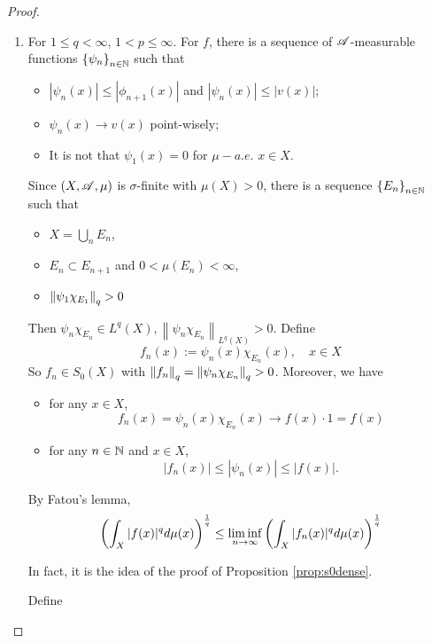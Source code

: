 \begin{proof}
\begin{enumerate}[label=(\roman*)]
		\item For $1 \leq q < \infty$, $1 < p \leq \infty$. For $f$, there is a sequence of $\mathscr{A}$-measurable functions $\left\{\psi_n\right\}_{n \in \mathbb{N}}$ such that
		\begin{itemize}
			\item $\left|\psi_n(x)\right| \leq\left|\phi_{n+1}(x)\right|$ and $\left|\psi_n(x)\right| \leq|v(x)|$;
			\item $\psi_n(x) \rightarrow v(x)$ point-wisely;
			\item It is not that $\psi_1(x) = 0$ for $\mu-a.e.$ $x \in X$.
		\end{itemize}
		Since $(X,\mathscr{A},\mu)$ is $\sigma$-finite with $\mu(X) > 0$, there is a sequence $\left\{E_n\right\}_{n \in \mathbb{N}}$ such that
		\begin{itemize}
			\item $X = \bigcup_n E_n$,
			\item $E_n \subset E_{n+1}$ and $0 < \mu(E_n) < \infty$,
			\item $\left\lVert\psi_1\chi_{E_1}\right\lVert_q > 0$
		\end{itemize}
		Then $\psi_n \chi_{E_n} \in L^q(X),\left\|\psi_n \chi_{E_n}\right\|_{L^q(X)}>0$. Define
		\begin{equation*}
			f_n(x):=\psi_n(x) \chi_{E_n}(x),\quad x\in X
		\end{equation*}
		So $f_n \in S_0(X)$ with $\left\lVert f_n\right\lVert_q = \left\lVert\psi_n\chi_{E_n}\right\lVert_q > 0$. Moreover, we have
		\begin{itemize}
			\item for any $x \in X$,
			\begin{equation*}
				f_n(x)=\psi_n(x) \chi_{E_n}(x) \longrightarrow f(x) \cdot 1=f(x)
			\end{equation*}
			\item for any $n \in \mathbb{N}$ and $x \in X$,
			\begin{equation*}
				\left|f_n(x)\right| \leq\left|\psi_n(x)\right| \leq|f(x)| .
			\end{equation*}
		\end{itemize}
		By Fatou's lemma,
		\begin{equation*}
			\left(\int_X|f(x)|^q d \mu(x)\right)^{\frac{1}{q}} \leq \liminf_{n \rightarrow \infty} \left(\int_X|f_n(x)|^q d \mu(x)\right)^{\frac{1}{q}}
		\end{equation*}
		\begin{rmk}
			In fact, it is the idea of the proof of Proposition \ref{prop:s0dense}.
		\end{rmk}
		Define
		\begin{equation*}

\end{equation*}
\end{enumerate}
\end{proof}
